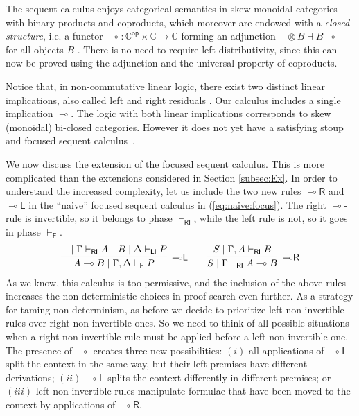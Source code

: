 \documentclass[submission,copyright,creativecommons]{eptcs}
\theoremstyle{definition}
\newcommand{\lright}{{\multimap}\mathsf{R}}
\newcommand{\lleft}{{\multimap}\mathsf{L}}
\newcommand{\ot}{\otimes}
\newcommand{\lolli}{\multimap}
\newcommand{\RI}{\mathsf{RI}}
\newcommand{\LI}{\mathsf{LI}}
\newcommand{\F}{\mathsf{F}}
\begin{document}
The sequent calculus enjoys categorical semantics in skew monoidal categories with binary products and coproducts, which moreover are endowed with a \emph{closed structure}, i.e. a functor $\lolli : \mathbb{C}^{\mathsf{op}} \times \mathbb{C} \rightarrow \mathbb{C}$ forming an adjunction ${-} \ot B \dashv B \lolli {-}$ for all objects $B$ \cite{street:skew-closed:2013}. There is no need to require left-distributivity, since this can now be proved using the adjunction and the universal property of coproducts.

Notice that, in non-commutative linear logic, there exist two distinct linear implications, also called left and right residuals \cite{lambek:mathematics:58}. Our calculus includes a single implication $\lolli$. The logic with both linear implications corresponds to skew (monoidal) bi-closed categories. However it does not yet have a satisfying stoup and focused sequent calculus~\cite{wan2024,WanPhD}.

We now discuss the extension of the focused sequent calculus. This is more complicated than the extensions considered in Section \ref{subsec:Ex}. In order to understand the increased complexity, let us include the two new rules $\lright$ and $\lleft$ in the ``naive'' focused sequent calculus in (\ref{eq:naive:focus}). The right $\lolli$-rule is invertible, so it belongs to phase $\vdash_\RI$, while the left rule is not, so it goes in phase $\vdash_\F$.
\begin{displaymath}
  \begin{array}{c}
    \infer[\lleft]{A \lolli B \mid \Gamma , \Delta \vdash_\F P}{
      - \mid \Gamma \vdash_\RI A
      &
      B \mid \Delta \vdash_\LI P
    }
    \qquad
    \infer[\lright]{S \mid \Gamma \vdash_\RI A \lolli B}{S \mid \Gamma , A \vdash_\RI B}
  \end{array}
\end{displaymath}
As we know, this calculus is too permissive, and the inclusion of the above rules increases the non-deterministic choices in proof search even further. As a strategy for taming non-determinism, as before we decide to prioritize left non-invertible rules over right non-invertible ones. So we need to think of all possible situations when a right non-invertible rule must be applied before a left non-invertible one. The presence of $\lolli$ creates three new possibilities: $(i)$ all applications of $\lleft$ split the context in the same way, but their left premises have different derivations; $(ii)$ $\lleft$ splits the context differently in different premises; or $(iii)$ left non-invertible rules manipulate formulae that have been moved to the context by applications of $\lright$.
\end{document}
